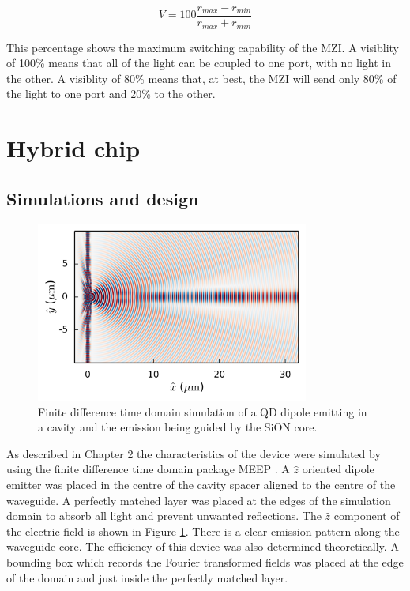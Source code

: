 \begin{equation} V = 100 \frac{r_{max} - r_{min}}{r_{max} + r_{min}}
\end{equation}

This percentage shows the maximum switching capability of the MZI. A visiblity
of 100\% means that all of the light can be coupled to one port, with no light
in the other. A visiblity of 80\% means that, at best, the MZI will send only
80\% of the light to one port and 20\% to the other.

\section{Hybrid chip}


\subsection{Simulations and design}

\begin{figure}[h!] \begin{center}
\includegraphics[width=0.8\textwidth]{images/sim.png} \caption{Finite difference
time domain simulation of a QD dipole emitting in a cavity and the emission
being guided by the SiON core.} \label{fig:sim} \end{center} \end{figure}

As described in Chapter 2 the characteristics of the device were simulated by
using the finite difference time domain package MEEP \cite{oskooi2010meep,
mandelshtam1997harmonic}. A $\hat{z}$ oriented dipole emitter was placed in the
centre of the cavity spacer aligned to the centre of the waveguide. A perfectly
matched layer was placed at the edges of the simulation domain to absorb all
light and prevent unwanted reflections. The $\hat{z}$ component of the electric
field is shown in Figure \ref{fig:sim}. There is a clear emission pattern along
the waveguide core. The efficiency of this device was also determined
theoretically. A bounding box which records the Fourier transformed fields was
placed at the edge of the domain and just inside the perfectly matched layer.

